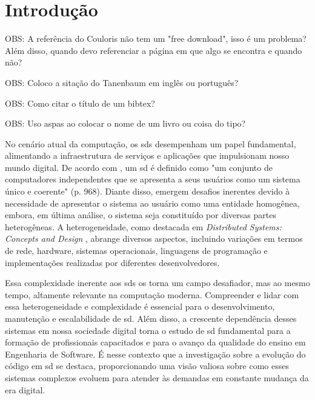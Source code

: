 
\chapter{Introdução}\label{cap:introducao}
OBS: A referência do Couloris não tem um "free download", isso é um problema? Além disso, quando devo referenciar a página em que algo se encontra e quando não?

OBS: Coloco a sitação do Tanenbaum em inglês ou português?

OBS: Como citar o título de um bibtex?

OBS: Uso aspas ao colocar o nome de um livro ou coisa do tipo?

No cenário atual da computação, os \gls{sds} desempenham um papel fundamental, alimentando a infraestrutura de serviços e aplicações que impulsionam nosso mundo digital. De acordo com \cite{TanenbaumDistributedSystemsThirdEdition}, um \gls{sd} é definido como "um conjunto de computadores independentes que se apresenta a seus usuários como um sistema único e coerente" (p. 968). Diante disso, emergem desafios inerentes devido à necessidade de apresentar o sistema ao usuário como uma entidade homogênea, embora, em última análise, o sistema seja constituído por diversas partes heterogêneas. A heterogeneidade, como destacada em \textit{Distributed Systems: Concepts and Design} \cite{DistributedSystemsCoulouris}, abrange diversos aspectos, incluindo variações em termos de rede, hardware, sistemas operacionais, linguagens de programação e implementações realizadas por diferentes desenvolvedores.

Essa complexidade inerente aos \gls{sds} os torna um campo desafiador, mas ao mesmo tempo, altamente relevante na computação moderna. Compreender e lidar com essa heterogeneidade e complexidade é essencial para o desenvolvimento, manutenção e escalabilidade de \gls{sd}. Além disso, a crescente dependência desses sistemas em nossa sociedade digital torna o estudo de \gls{sd} fundamental para a formação de profissionais capacitados e para o avanço da qualidade do ensino em Engenharia de Software. É nesse contexto que a investigação sobre a evolução do código em \gls{sd} se destaca, proporcionando uma visão valiosa sobre como esses sistemas complexos evoluem para atender às demandas em constante mudança da era digital.


